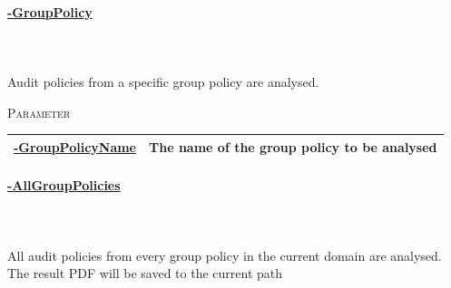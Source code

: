 \begin{tcolorbox}
    \paragraph{\underline{-GroupPolicy}} \ \\\\ Audit policies from a specific group policy are analysed.
    \vspace{0.3cm}
    \begin{center}
        \textsc{Parameter}
    \end{center}
    \vspace{-0.5cm}
    \begin{table}[H]
        \def\arraystretch{2}
        \centering
        \begin{tabular}{ p{4cm}  p{10cm} } \hline
            \textbf{\underline{-GroupPolicyName}} & The name of the group policy to be analysed \\ \hline
        \end{tabular}
    \end{table}
\end{tcolorbox}

\begin{tcolorbox}
    \paragraph{\underline{-AllGroupPolicies}} \ \\\\
    All audit policies from every group policy in the current domain are analysed.\\
    The result PDF will be saved to the current path
\end{tcolorbox}
